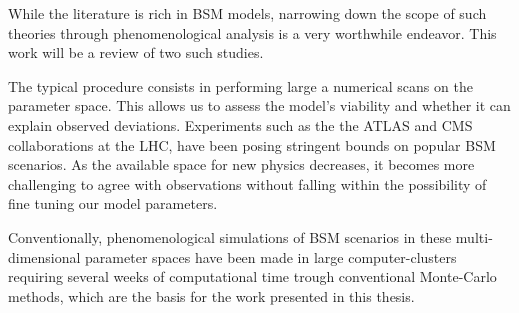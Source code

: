 While the literature is rich in BSM models, narrowing down the scope of such theories through phenomenological analysis is a very worthwhile endeavor. This work will be a review of two such studies. %

The typical procedure consists in performing large a numerical scans on the parameter space. %
%
This allows us to assess the model's viability and whether it can explain observed deviations. 
%
%
%
%
Experiments such as the the ATLAS and CMS collaborations at the LHC, have been posing stringent bounds on popular BSM scenarios. 
%
As the available space for new physics decreases, it becomes more challenging to agree with observations without falling within the possibility of fine tuning our model parameters.
%

%

Conventionally, phenomenological simulations of BSM scenarios in these multi-dimensional parameter spaces have been made in large computer-clusters requiring several weeks of computational time trough conventional Monte-Carlo methods, which are the basis for the work presented in this thesis.
%
%
%

